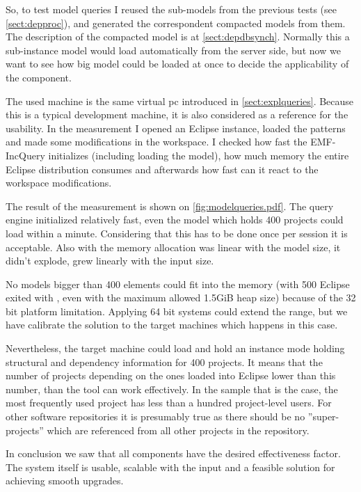 So, to test model queries I reused the sub-models from the previous tests (see
\autoref{sect:depproc}), and generated the correspondent compacted models from
them.
The description of the compacted model is at \autoref{sect:depdbsynch}. Normally
this a sub-instance model would load automatically from the server side, but now
we want to see how big model could be loaded at once to decide the applicability
of the component.

The used machine is the same virtual pc introduced in
\autoref{sect:explqueries}. Because this is a typical development machine, it is
also considered as a reference for the usability. In the measurement I opened an
Eclipse instance, loaded the patterns and made some modifications in the
workspace. I checked how fast the EMF-IncQuery initializes (including loading
the model), how much memory the entire Eclipse distribution consumes and
afterwards how fast can it react to the workspace modifications.

The result of the measurement is shown on \autoref{fig:modelqueries.pdf}.
The query engine initialized relatively fast, even the model which holds 400
projects could load within a minute. Considering that this has to be done once
per session it is acceptable. Also with the memory allocation was linear with 
the model size, it didn't explode, grew linearly with the input size. 

No models bigger than 400 elements could fit into the memory (with 500 Eclipse
exited with , even with the maximum allowed 1.5GiB heap size)
because of the 32 bit platform limitation. Applying 64 bit systems could extend
the range, but we have calibrate the solution to the target machines which
happens in this case.

Nevertheless, the target machine could load and hold an instance mode holding
structural and dependency information for 400 projects. It means that the number
of projects depending on the ones loaded into Eclipse lower than this number,
than the tool can work effectively. In the sample that is the case, the most
frequently used project has less than a hundred project-level users. For other
 software repositories it is presumably true as there should be no
 ''super-projects'' which are referenced from all other projects in the
 repository.
 
In conclusion we saw that all components have the desired effectiveness factor.
The system itself is usable, scalable with the input and a feasible solution for
achieving smooth upgrades. 
